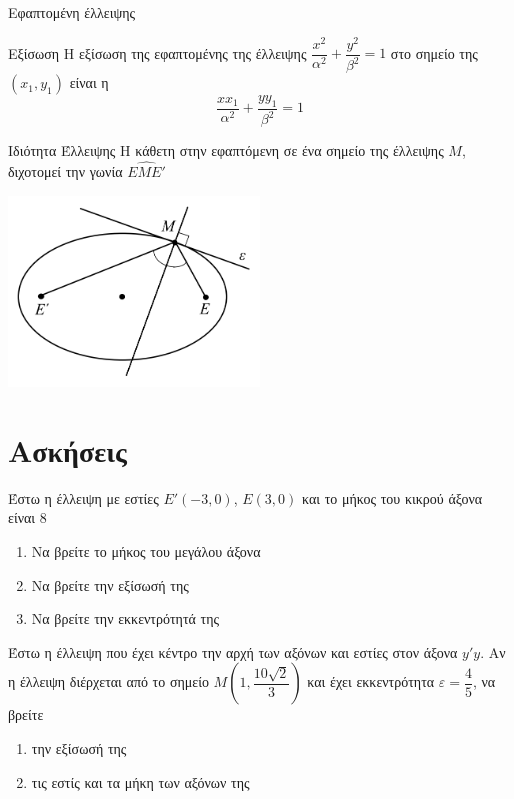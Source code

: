 \documentclass[greek]{beamer}
\begin{document}
\begin{frame}[label=Εφαπτόμενη]{Εφαπτομένη έλλειψης}
  \begin{block}{Εξίσωση}
    Η εξίσωση της εφαπτομένης της έλλειψης $\dfrac{x^2}{α^2}+\dfrac{y^2}{β^2}=1$ στο σημείο της $(x_1,y_1)$ είναι η $$\dfrac{xx_1}{α^2}+\dfrac{yy_1}{β^2}=1$$
  \end{block}

  \hyperlink{ΑπόδειξηΕφαπτόμενη}{}
\end{frame}

\begin{frame}[label=Ιδιότητες]{Ιδιότητα Έλλειψης}
  Η κάθετη στην εφαπτόμενη σε ένα σημείο της έλλειψης $Μ$, διχοτομεί την γωνία $\widehat{ΕΜΕ'}$

  \centering
  \includegraphics[width=0.5\textwidth]{"../images/reflection2.png"}

  \hyperlink{Απόδειξη}{}
\end{frame}

\section{Ασκήσεις}
\begin{askisi}
  Έστω η έλλειψη με εστίες $Ε'(-3,0)$, $Ε(3,0)$ και το μήκος του κικρού άξονα είναι $8$
  \begin{enumerate}
    \item<1-> Να βρείτε το μήκος του μεγάλου άξονα
    \item<2-> Να βρείτε την εξίσωσή της
    \item<3-> Να βρείτε την εκκεντρότητά της
  \end{enumerate}


\end{askisi}

\begin{askisi}
  Έστω η έλλειψη που έχει κέντρο την αρχή των αξόνων και εστίες στον άξονα $y'y$. Αν η έλλειψη διέρχεται από το σημείο $Μ\left( 1,\dfrac{10\sqrt{2}}{3} \right) $ και έχει εκκεντρότητα $ε=\dfrac{4}{5}$, να βρείτε
  \begin{enumerate}
    \item<1-> την εξίσωσή της
    \item<2-> τις εστίς και τα μήκη των αξόνων της
  \end{enumerate}


\end{askisi}
\end{document}
